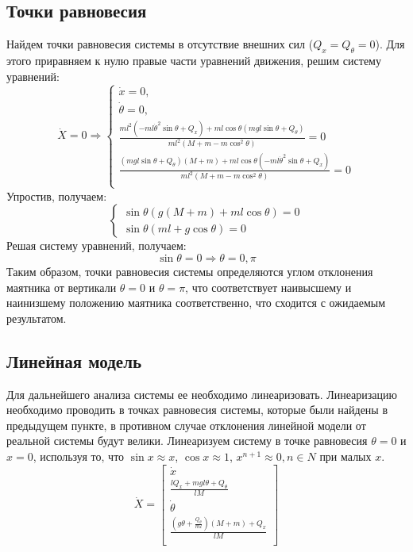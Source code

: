 \subsection{Точки равновесия}
Найдем точки равновесия системы в отсутствие внешних сил ($Q_x = Q_{\theta} = 0$). 
Для этого приравняем к нулю правые части уравнений движения, решим систему уравнений:
\begin{equation}
    \dot{X} = 0 \Rightarrow 
    \begin{cases}
        \dot{x} = 0, \\
        \dot{\theta} = 0, \\
        \frac{ml^2(-ml\dot{\theta}^2\sin\theta + Q_x) + ml\cos\theta(mgl\sin\theta + Q_{\theta}) }{ml^2(M + m - m\cos^2\theta)} = 0 \\
        \frac{(mgl\sin\theta + Q_{\theta})(M + m) + ml\cos\theta(-ml\dot{\theta}^2\sin\theta + Q_x) }{ml^2(M + m - m\cos^2\theta)}  = 0 \\ 
    \end{cases}
\end{equation}
Упростив, получаем: 
\begin{equation}
    \begin{cases}
        \sin\theta(g(M + m) + ml\cos\theta) = 0 \\ 
        \sin\theta(ml + g\cos\theta) = 0
    \end{cases}
\end{equation}
Решая систему уравнений, получаем:
\begin{equation}
    \sin\theta = 0 \Rightarrow \theta = 0, \pi 
\end{equation}
Таким образом, точки равновесия системы определяются углом отклонения маятника от вертикали $\theta = 0$ и $\theta = \pi$, 
что соответствует наивысшему и наинизшему положению маятника соответственно, что сходится с ожидаемым результатом. 

\subsection{Линейная модель}
Для дальнейшего анализа системы ее необходимо линеаризовать. Линеаризацию необходимо проводить в точках равновесия 
системы, которые были найдены в предыдущем пункте, в противном случае отклонения линейной модели от реальной системы будут велики. 
Линеаризуем систему в точке равновесия $\theta = 0$ и $x = 0$, используя то, что $\sin x \approx x$, $\cos x \approx 1$, $x^{n + 1} \approx 0, n \in N$ 
при малых $x$. 
\begin{equation}
    \dot{X} = \begin{bmatrix}
        \dot{x} \\
        \frac{lQ_x + mgl\theta + Q_{\theta} }{lM} \\ 
        \dot{\theta} \\
        \frac{(g\theta + \frac{Q_{\theta}}{ml})(M + m) + Q_x}{lM} \\ 
    \end{bmatrix}
\end{equation}

